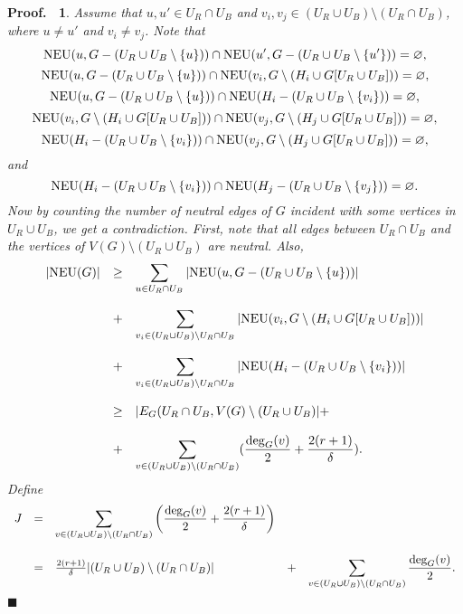 \documentclass[11pt]{article}
\newtheorem{preproof}{{\bf Proof.\ }}
\newenvironment{proof}[1]{\begin{preproof}{\rm
               #1}\hfill{$\blacksquare$}}{\end{preproof}}
\begin{document}
\begin{proof}
{Assume that $u, u'\in U_R\cap U_B$ and $v_i, v_j \in (U_R\cup U_B) \setminus (U_R\cap U_B)$, where  $u\neq u'$ and $v_i\neq v_j$. 
Note that 
$${\rm NEU}(u, G- (U_R\cup U_B\setminus\{u\}))\cap {\rm NEU}(u', G- (U_R\cup U_B\setminus\{u'\}))=\varnothing,$$
$${\rm NEU}(u, G- (U_R\cup U_B\setminus\{u\}))\cap {\rm NEU}(v_i, G\setminus (H_i\cup G[U_R\cup U_B]))=\varnothing,$$
$${\rm NEU}(u, G- (U_R\cup U_B\setminus\{u\}))\cap{\rm NEU}(H_i-(U_R\cup U_B\setminus\{v_i\}))=\varnothing,$$
$${\rm NEU}(v_i, G\setminus (H_i\cup G[U_R\cup U_B])) \cap {\rm NEU}(v_j, G\setminus (H_j\cup G[U_R\cup U_B]))=\varnothing,$$ 
$${\rm NEU}(H_i-(U_R\cup U_B\setminus\{v_i\})) \cap{\rm NEU}(v_j, G\setminus (H_j\cup G[U_R\cup U_B]))=\varnothing,$$ 
and 
$${\rm NEU}(H_i-(U_R\cup U_B\setminus\{v_i\})) \cap {\rm NEU}(H_j-(U_R\cup U_B\setminus\{v_j\}))=\varnothing.$$
Now by counting the number of neutral edges of $G$ incident with some vertices in $U_R\cup U_B$, we get a contradiction. 
First, note that all edges between $U_R\cap U_B$ and the vertices of $V(G)\setminus (U_R\cup U_B)$ are neutral. Also, 
$$\begin{array}{lll}
|{\rm NEU}(G)| & \geq& \displaystyle\sum_{u\in U_R\cap U_B} |{\rm NEU}(u, G- (U_R\cup U_B\setminus\{u\}))| \\ 
   &&\\
   &+& \displaystyle\sum_{v_i\in (U_R\cup U_B)\setminus U_R\cap U_B}|{\rm NEU}(v_i, G\setminus (H_i\cup G[U_R\cup U_B]))|\\
&&\\
&+ & \displaystyle\sum_{v_i\in (U_R\cup U_B)\setminus U_R\cap U_B} |{\rm NEU}(H_i-(U_R\cup U_B\setminus\{v_i\}))|\\
 &&\\
  & \geq & |E_G(U_R\cap U_B, V(G)\setminus (U_R\cup U_B)|+ \\
   &&\\
&+ & \displaystyle\sum_{v\in (U_R\cup U_B)\setminus (U_R\cap U_B)}({{\rm deg}_G(v)\over 2}+{2(r+1)\over \delta}). 
\end{array}
$$ 
Define
$$\begin{array}{lllll}
J & = & \displaystyle\sum_{v\in (U_R\cup U_B)\setminus (U_R\cap U_B)}\left({{\rm deg}_G(v)\over 2}+{2(r+1)\over \delta}\right) & \\
 &&&&\\
& = & {2(r+1)\over \delta}|(U_R\cup U_B)\setminus (U_R\cap U_B)| & + &
\displaystyle\sum_{v\in (U_R\cup U_B)\setminus (U_R\cap U_B)}{{\rm deg}_G(v)\over 2}.
\end{array}$$
}
\end{proof}
\end{document}
